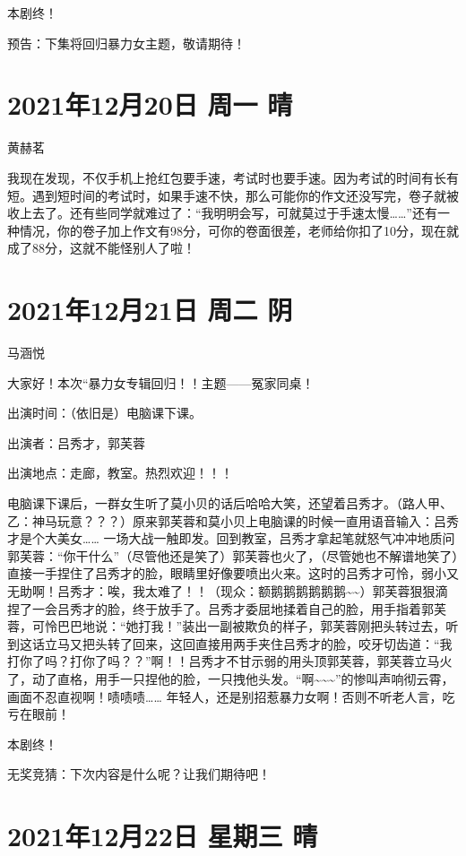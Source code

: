 本剧终！

预告：下集将回归暴力女主题，敬请期待！

\section{2021年12月20日 周一 晴}

黄赫茗

我现在发现，不仅手机上抢红包要手速，考试时也要手速。因为考试的时间有长有短。遇到短时间的考试时，如果手速不快，那么可能你的作文还没写完，卷子就被收上去了。还有些同学就难过了：“我明明会写，可就莫过于手速太慢……”还有一种情况，你的卷子加上作文有98分，可你的卷面很差，老师给你扣了10分，现在就成了88分，这就不能怪别人了啦！

\section{2021年12月21日 周二 阴}

马涵悦

大家好！本次“暴力女专辑回归！！主题——冤家同桌！

出演时间：（依旧是）电脑课下课。

出演者：吕秀才，郭芙蓉

出演地点：走廊，教室。热烈欢迎！！！

电脑课下课后，一群女生听了莫小贝的话后哈哈大笑，还望着吕秀才。（路人甲、乙：神马玩意？？？）原来郭芙蓉和莫小贝上电脑课的时候一直用语音输入：吕秀才是个大美女…… 一场大战一触即发。回到教室，吕秀才拿起笔就怒气冲冲地质问郭芙蓉：“你干什么”（尽管他还是笑了）郭芙蓉也火了，（尽管她也不解谱地笑了）直接一手捏住了吕秀才的脸，眼睛里好像要喷出火来。这时的吕秀才可怜，弱小又无助啊！吕秀才：唉，我太难了！！（现众：额鹅鹅鹅鹅鹅鹅\textasciitilde\textasciitilde）郭芙蓉狠狠滴捏了一会吕秀才的脸，终于放手了。吕秀才委屈地揉着自己的脸，用手指着郭芙蓉，可怜巴巴地说：“她打我！”装出一副被欺负的样子，郭芙蓉刚把头转过去，听到这话立马又把头转了回来，这回直接用两手夹住吕秀才的脸，咬牙切齿道：“我打你了吗？打你了吗？？”啊！！吕秀才不甘示弱的用头顶郭芙蓉，郭芙蓉立马火了，动了直格，用手一只捏他的脸，一只拽他头发。“啊\textasciitilde\textasciitilde\textasciitilde{}”的惨叫声响彻云霄，画面不忍直视啊！啧啧啧…… 年轻人，还是别招惹暴力女啊！否则不听老人言，吃亏在眼前！

本剧终！

无奖竞猜：下次内容是什么呢？让我们期待吧！

\section{2021年12月22日 星期三 晴}

